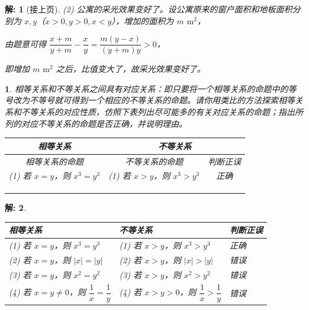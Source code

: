 \documentclass[aspectratio=169,13pt,fleqn,t] {beamer}
\newtheorem*{solve}{解:}
\newtheorem{Prob}{}
\begin{document}
	

\begin{frame}
	\begin{solve}[接上页]	
	\vspace{1ex}
	(2) 公寓的采光效果变好了。设公寓原来的窗户面积和地板面积分别为 $x,y$（$x>0,y>0,x<y$），增加的面积为 $m$ $ \mathrm{m^2}$，
	
	由题意可得 $\dfrac{x+m}{y+m}-\dfrac{x}{y}=\dfrac{m(y-x)}{(y+m)y}>0$，\rule[15pt]{0pt}{10pt}\rule[-20pt]{0pt}{10pt}
	
	即增加 $m$ $ \mathrm{m^2}$ 之后，比值变大了，故采光效果变好了。
	\end{solve}
\end{frame}

\begin{frame}
	\vspace{-1em}
	\begin{Prob}

	相等关系和不等关系之间具有对应关系：即只要将一个相等关系的命题中的等号改为不等号就可得到一个相应的不等关系的命题。请你用类比的方法探索相等关系和不等关系的对应性质，仿照下表列出尽可能多的有关对应关系的命题；指出所列的对应不等关系的命题是否正确，并说明理由。
	
	\begin{center}
		\begin{tabular}{|c|c|c|}
			\hline
		相等关系	&	\multicolumn{2}{c|}{不等关系}   \\
			\hline
			相等关系的命题 & 不等关系的命题 & 判断正误 \\
			\hline
		\upshape	(1) 若 $x=y$，则 $x^3=y^3$ & \upshape (1) 若 $x>y$，则 $x^3>y^3$ & 正确 \\
			\hline
			& & \\
			& & \\
			& & \\
			\hline
		\end{tabular}
	\end{center}
	\end{Prob}


\end{frame}

\begin{frame}{}
	\begin{solve}
			\begin{center}\upshape
			\begin{tabular}{lll}
				\toprule
				\textbf{相等关系} & \textbf{不等关系} & \textbf{判断正误} \\
				\midrule
				(1) 若 $x=y$，则 $x^3=y^3$ & (1) 若 $x>y$，则 $x^3>y^3$ & 正确 \\
				(2) 若 $x=y$，则 $|x|=|y|$ & (2) 若 $x>y$，则 $|x|>|y|$ & 错误 \\
				(3) 若 $x=y$，则 $x^2=y^2$ & (3) 若 $x>y$，则 $x^2>y^2$ & 错误 \\
				(4) 若 $x=y\neq 0$，则 $\dfrac{1}{x}=\dfrac{1}{y}$ & (4) 若 $x>y>0$，则 $\dfrac{1}{x}>\dfrac{1}{y}$ & 错误 \\
				\bottomrule
			\end{tabular}
		\end{center}
	\end{solve}
\end{frame}
\end{document}
